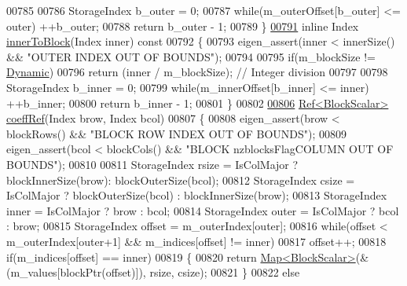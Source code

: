 \begin{DoxyCode}
00785 
00786       StorageIndex b\_outer = 0;
00787       \textcolor{keywordflow}{while}(m\_outerOffset[b\_outer] <= outer) ++b\_outer;
00788       \textcolor{keywordflow}{return} b\_outer - 1;
00789     \}
\hyperlink{group___sparse_core___module_a53fd11658531b86986cd2a5fb2ea3d3d}{00791}     \textcolor{keyword}{inline} Index \hyperlink{group___sparse_core___module_a53fd11658531b86986cd2a5fb2ea3d3d}{innerToBlock}(Index inner)\textcolor{keyword}{ const}
00792 \textcolor{keyword}{    }\{
00793       eigen\_assert(inner < innerSize() && \textcolor{stringliteral}{"OUTER INDEX OUT OF BOUNDS"});
00794 
00795       \textcolor{keywordflow}{if}(m\_blockSize != \hyperlink{namespace_eigen_ad81fa7195215a0ce30017dfac309f0b2}{Dynamic})
00796         \textcolor{keywordflow}{return} (inner / m\_blockSize); \textcolor{comment}{// Integer division}
00797 
00798       StorageIndex b\_inner = 0;
00799       \textcolor{keywordflow}{while}(m\_innerOffset[b\_inner] <= inner) ++b\_inner;
00800       \textcolor{keywordflow}{return} b\_inner - 1;
00801     \}
00802 
\hyperlink{group___sparse_core___module_af7d43390424f705f281c41a2c07db92f}{00806}     \hyperlink{group___core___module_class_eigen_1_1_ref}{Ref<BlockScalar>} \hyperlink{group___sparse_core___module_af7d43390424f705f281c41a2c07db92f}{coeffRef}(Index brow, Index bcol)
00807     \{
00808       eigen\_assert(brow < blockRows() && \textcolor{stringliteral}{"BLOCK ROW INDEX OUT OF BOUNDS"});
00809       eigen\_assert(bcol < blockCols() && \textcolor{stringliteral}{"BLOCK nzblocksFlagCOLUMN OUT OF BOUNDS"});
00810 
00811       StorageIndex rsize = IsColMajor ? blockInnerSize(brow): blockOuterSize(bcol);
00812       StorageIndex csize = IsColMajor ? blockOuterSize(bcol) : blockInnerSize(brow);
00813       StorageIndex inner = IsColMajor ? brow : bcol;
00814       StorageIndex outer = IsColMajor ? bcol : brow;
00815       StorageIndex offset = m\_outerIndex[outer];
00816       \textcolor{keywordflow}{while}(offset < m\_outerIndex[outer+1] && m\_indices[offset] != inner)
00817         offset++;
00818       \textcolor{keywordflow}{if}(m\_indices[offset] == inner)
00819       \{
00820         \textcolor{keywordflow}{return} \hyperlink{group___core___module_class_eigen_1_1_map}{Map<BlockScalar>}(&(m\_values[blockPtr(offset)]), rsize, csize);
00821       \}
00822       \textcolor{keywordflow}{else}

\end{DoxyCode}
